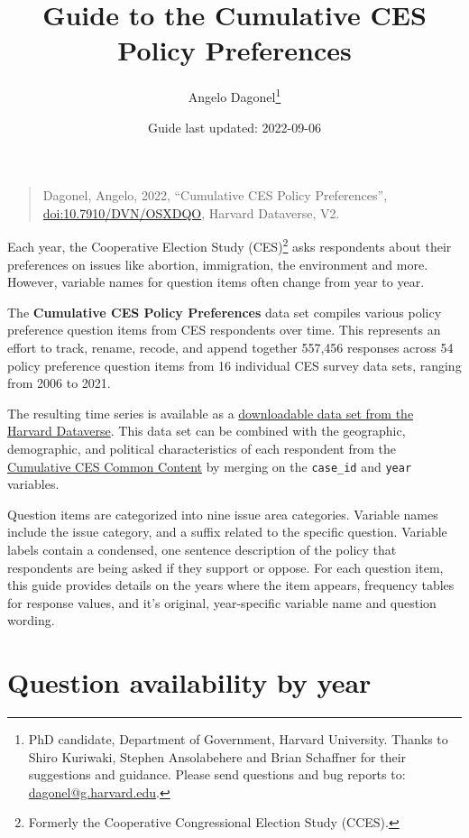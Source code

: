 \documentclass[
  12pt]{article}
\title{\Large Guide to the Cumulative CES Policy Preferences}
\author{Angelo Dagonel\footnote{PhD candidate, Department of Government,
  Harvard University. Thanks to Shiro Kuriwaki, Stephen Ansolabehere and
  Brian Schaffner for their suggestions and guidance. Please send
  questions and bug reports to: \url{dagonel@g.harvard.edu}.}}
\date{Guide last updated: 2022-09-06}
\begin{document}
\maketitle

\begin{quote}
Dagonel, Angelo, 2022, ``Cumulative CES Policy Preferences'',
\href{https://dataverse.harvard.edu/dataset.xhtml?persistentId=doi:10.7910/DVN/OSXDQO}{\url{doi:10.7910/DVN/OSXDQO}},
Harvard Dataverse, V2.
\end{quote}

\bigskip

Each year, the Cooperative Election Study (CES)\footnote{Formerly the
  Cooperative Congressional Election Study (CCES).} asks respondents
about their preferences on issues like abortion, immigration, the
environment and more. However, variable names for question items often
change from year to year.

\medskip

The \textbf{Cumulative CES Policy Preferences} data set compiles various
policy preference question items from CES respondents over time. This
represents an effort to track, rename, recode, and append together
557,456 responses across 54 policy preference question items from 16
individual CES survey data sets, ranging from 2006 to 2021.

\medskip

The resulting time series is available as a
\href{https://dataverse.harvard.edu/dataset.xhtml?persistentId=doi:10.7910/DVN/OSXDQO}{downloadable
data set from the Harvard Dataverse}. This data set can be combined with
the geographic, demographic, and political characteristics of each
respondent from the
\href{https://dataverse.harvard.edu/dataset.xhtml?persistentId=doi:10.7910/DVN/II2DB6}{Cumulative
CES Common Content} by merging on the \texttt{case\_id} and
\texttt{year} variables.

\medskip

Question items are categorized into nine issue area categories. Variable
names include the issue category, and a suffix related to the specific
question. Variable labels contain a condensed, one sentence description
of the policy that respondents are being asked if they support or
oppose. For each question item, this guide provides details on the years
where the item appears, frequency tables for response values, and it's
original, year-specific variable name and question wording.

\newpage

\hypertarget{question-availability-by-year}{%
\section{Question availability by
year}\label{question-availability-by-year}}
\end{document}
